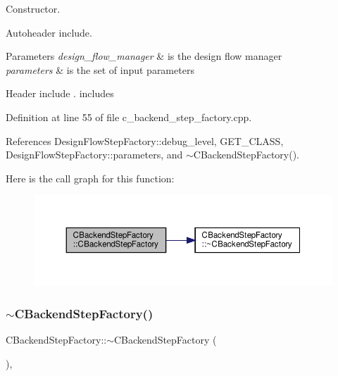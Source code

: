 Constructor. 

Autoheader include.


\begin{DoxyParams}{Parameters}
{\em design\+\_\+flow\+\_\+manager} & is the design flow manager \\
\hline
{\em parameters} & is the set of input parameters\\
\hline
\end{DoxyParams}
Header include . includes 

Definition at line 55 of file c\+\_\+backend\+\_\+step\+\_\+factory.\+cpp.



References Design\+Flow\+Step\+Factory\+::debug\+\_\+level, G\+E\+T\+\_\+\+C\+L\+A\+SS, Design\+Flow\+Step\+Factory\+::parameters, and $\sim$\+C\+Backend\+Step\+Factory().

Here is the call graph for this function\+:
\nopagebreak
\begin{figure}[H]
\begin{center}
\leavevmode
\includegraphics[width=350pt]{d9/d16/classCBackendStepFactory_a7029c2c9d67bc75052c963a3a179e049_cgraph}
\end{center}
\end{figure}
\mbox{\label{classCBackendStepFactory_aa1e12def0da538e05942f60146729316}} 
\subsubsection{\texorpdfstring{$\sim$\+C\+Backend\+Step\+Factory()}{~CBackendStepFactory()}}
{\footnotesize\ttfamily C\+Backend\+Step\+Factory\+::$\sim$\+C\+Backend\+Step\+Factory (\begin{DoxyParamCaption}{ }\end{DoxyParamCaption})\hspace{0.3cm}{\ttfamily [override]}, {\ttfamily [default]}}



